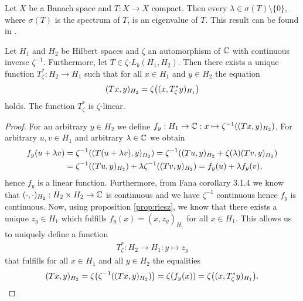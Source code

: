 \begin{remark} \label{remark:compact_spectrum}
	Let $X$ be a Banach space and $T: X \to X$ compact. Then every $\lambda \in \sigma(T) \setminus\{0\}$, where $\sigma(T)$ is the spectrum of $T$, is an eigenvalue of $T$. This result can be found in \cite[p.138]{FAna1}.
\end{remark}

\begin{lemma}
	Let $H_1$ and $H_2$ be Hilbert spaces and $\zeta$ an automorphism of $\mathbb{C}$ with continuous inverse $\zeta^{-1}$. Furthermore, let $T \in \zeta\text{-}L_b(H_1, H_2)$. Then there exists a unique function $T_\zeta^\ast: H_2 \to H_1$ such that for all $x \in H_1$ and $y \in H_2$ the equation 
	\begin{align*}
		(Tx, y)_{H_2} = \zeta{\left ( (x, T_\zeta^\ast y)_{H_1} \right )}
	\end{align*}
	holds. The function $T_\zeta^\ast$ is $\zeta$-linear.
\end{lemma}

\begin{proof}
	For an arbitrary $y \in H_2$ we define $f_y: H_1 \to \mathbb{C}: x \mapsto \zeta^{-1}{\left ( (Tx,y)_{H_2} \right )}$. For arbitrary $u,v \in H_1$ and arbitrary $\lambda \in \mathbb{C}$ we obtain
	\begin{align*}
		f_y(u + \lambda v) &= \zeta^{-1}{\left ( (T(u + \lambda v), y)_{H_2} \right )} = \zeta^{-1}{\left ( (Tu, y)_{H_2} + \zeta(\lambda) (Tv, y)_{H_2} \right )} \\
		&= \zeta^{-1}{\left ( (Tu,y)_{H_2} \right )} + \lambda \zeta^{-1}{\left ( (Tv,y)_{H_2} \right )} = f_y(u) + \lambda f_y(v),
	\end{align*}
	hence $f_y$ is a linear function. Furthermore, from Fana corollary 3.1.4 we know that $(\cdot, \cdot)_{H_2}: H_2 \times H_2 \to \mathbb{C}$ is continuous and we have $\zeta^{-1}$ continuous hence $f_y$ is continuous. Now, using proposition \ref{prop:riesz}, we know that there exists a unique $z_y \in H_1$ which fulfills $f_y(x) = (x,z_y)_{H_1}$ for all $x \in H_1$. This allows us to uniquely define a function
	\begin{align*}
		T_\zeta^\ast: H_2 \to H_1: y \mapsto z_y
	\end{align*}
	that fulfills for all $x \in H_1$ and all $y \in H_2$ the equalities
	\begin{align*}
		(Tx,y)_{H_2} = \zeta{\left ( \zeta^{-1}{\left ( (Tx,y)_{H_2} \right )} \right )} = \zeta{\left ( f_y(x) \right )} = \zeta {\left ( (x, T_\zeta^\ast y)_{H_1} \right )}.
	\end{align*}
\end{proof}


